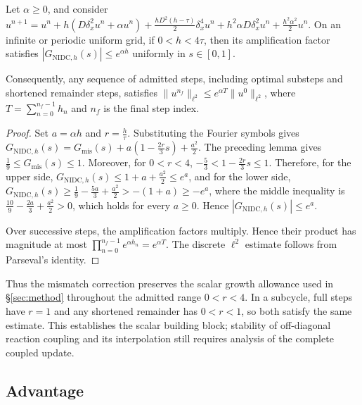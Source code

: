 \begin{theorem}\label{thm:r1-stab}
Let $\alpha\ge0$, and consider
$u^{n+1}
=u^n+h(D\delta_x^2u^n+\alpha u^n)
+\frac{hD^2(h-\tau)}{2}\delta_x^4u^n
+h^2\alpha D\delta_x^2u^n
+\frac{h^2\alpha^2}{2}u^n$.
On an infinite or periodic uniform grid, if $0<h<4\tau$, then its amplification factor satisfies $|G_{\mathrm{NIDC},h}(s)|\le e^{\alpha h}$ uniformly in $s\in[0,1]$.

Consequently, any sequence of admitted steps, including optimal substeps and shortened remainder steps, satisfies
$\|u^{n_f}\|_{\ell^2}\le e^{\alpha T}\|u^0\|_{\ell^2}$,
where $T=\sum_{n=0}^{n_f-1}h_n$ and $n_f$ is the final step index.
\end{theorem}

\begin{proof}
Set $a=\alpha h$ and $r=\frac{h}{\tau}$. Substituting the Fourier symbols gives
$G_{\mathrm{NIDC},h}(s)
=G_{\mathrm{mis}}(s)
+a\left(1-\frac{2r}{3}s\right)
+\frac{a^2}{2}$.
The preceding lemma gives $\frac19\le G_{\mathrm{mis}}(s)\le1$. Moreover, for $0<r<4$,
$-\frac{5}{3}<1-\frac{2r}{3}s\le1$.
Therefore, for the upper side,
$G_{\mathrm{NIDC},h}(s)\le1+a+\frac{a^2}{2}\le e^a$,
and for the lower side,
$G_{\mathrm{NIDC},h}(s)\ge\frac19-\frac{5a}{3}+\frac{a^2}{2}>-(1+a)\ge-e^a$,
where the middle inequality is $\frac{10}{9}-\frac{2a}{3}+\frac{a^2}{2}>0$, which holds for every $a\ge0$. Hence $|G_{\mathrm{NIDC},h}(s)|\le e^a$.

Over successive steps, the amplification factors multiply. Hence their product has magnitude at most
$\prod_{n=0}^{n_f-1}e^{\alpha h_n}=e^{\alpha T}$.
The discrete $\ell^2$ estimate follows from Parseval's identity.
\end{proof}

Thus the mismatch correction preserves the scalar growth allowance used in \S\ref{sec:method} throughout the admitted range $0<r<4$. In a subcycle, full steps have $r=1$ and any shortened remainder has $0<r<1$, so both satisfy the same estimate. This establishes the scalar building block; stability of off-diagonal reaction coupling and its interpolation still requires analysis of the complete coupled update.

\subsection{Advantage}
